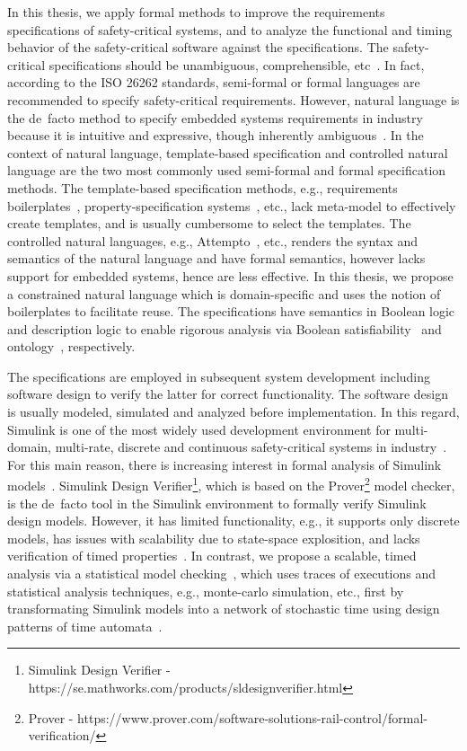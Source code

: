 In this thesis, we apply formal methods to improve the requirements specifications of safety-critical systems, and to analyze the functional and timing behavior of the safety-critical software against the specifications. The safety-critical  specifications should be unambiguous, comprehensible, etc~\cite{ieereqspecstandard}. In fact, according to the ISO 26262 standards, semi-formal or formal languages are recommended to specify safety-critical requirements. However, natural language is the de~facto method to specify embedded systems requirements in industry because it is intuitive and expressive, though inherently ambiguous~\cite{ieereqspecstandard}. In the context of natural language, template-based specification and controlled natural language are the two most commonly used semi-formal and formal specification methods. The template-based specification methods, e.g., requirements boilerplates~\cite{Hull2011RequirementsEngineering}, property-specification systems~\cite{Dwyer1999PatternsVerificationb}, etc., lack meta-model to effectively create templates, and is usually cumbersome to select the templates. The controlled natural languages, e.g., Attempto~\cite{attempto96}\cite{Fuchs2008AttemptoRepresentation}, etc., renders the syntax and semantics of the natural language and have formal semantics, however lacks support for embedded systems, hence are less effective. In this thesis, we propose a constrained natural language which is domain-specific and uses the notion of boilerplates to facilitate reuse. The specifications have semantics in Boolean logic and description logic to enable rigorous analysis via Boolean satisfiability~\cite{Malik2009BooleanSuccess} and ontology~\cite{borst}, respectively.

The specifications are employed in subsequent system development including software design to verify the latter for correct functionality. The software design is usually modeled, simulated and analyzed before implementation. In this regard, Simulink is one of the most widely used development environment for multi-domain, multi-rate, discrete and continuous safety-critical systems in industry~\cite{JamesB.Dabney2003MasteringSimulink}. For this main reason, there is increasing interest in formal analysis of Simulink models~\cite{Manamcheri2011AModels}. Simulink Design Verifier\footnote{Simulink Design Verifier - https://se.mathworks.com/products/sldesignverifier.html}, which is based on the Prover\footnote{Prover - https://www.prover.com/software-solutions-rail-control/formal-verification/} model checker, is the de~facto tool in the Simulink environment to formally verify Simulink design models. However, it has limited functionality, e.g., it supports only discrete models, has issues with scalability due to state-space explosition, and lacks verification of timed properties~\cite{Leitner2008SimulinkStudy}.  In contrast, we propose a scalable, timed analysis via a statistical model checking~\cite{Legay2010StatisticalOverview}, which uses traces of executions and statistical analysis techniques, e.g., monte-carlo simulation, etc., first by transformating Simulink models into a network of stochastic time using design patterns of time automata~\cite{Simppaal - A Framework For Statistical Model Checking of Industrial Simulink Models}.

